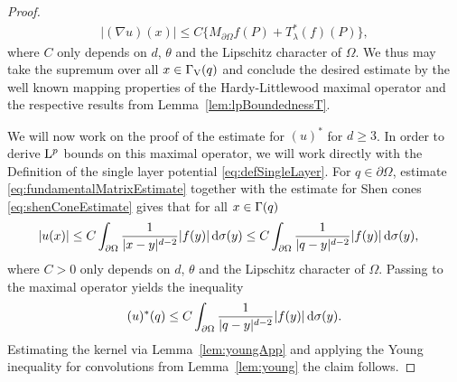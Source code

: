 \begin{proof}
  \begin{align*}
    |(\nabla u)(x)| \leq C \Big\{ M_{\partial\Omega} f(P) + T_\lambda^*(f)(P) \Big\},
  \end{align*}
  where $C$ only depends on $d$, $\theta$ and the Lipschitz character of $\Omega$.
  We thus may take the supremum over all $x \in \Gamma_\mathrm{V}(q)$ and conclude the desired estimate by the well known mapping properties of the Hardy-Littlewood maximal operator and the respective results from Lemma~\ref{lem:lpBoundednessT}.

  We will now work on the proof of the estimate for $(u)^*$ for $d \geq 3$.
  In order to derive $\mathrm{L}^p$ bounds on this maximal operator, we will work directly with the Definition of the single layer potential \eqref{eq:defSingleLayer}.
  For $q \in \partial\Omega$, estimate \eqref{eq:fundamentalMatrixEstimate} together with the estimate for Shen cones \eqref{eq:shenConeEstimate} gives that for all $x \in \Gamma(q)$
  \begin{align*}
    |u(x)| 
    &\leq  C \int_{\partial\Omega} \frac{1}{|x - y|^{d - 2}} |f(y)| \, {\operatorname{d}\!{\sigma}}(y) 
    \leq  C \int_{\partial\Omega} \frac{1}{|q - y|^{d - 2}} |f(y)| \, {\operatorname{d}\!{\sigma}}(y),
  \end{align*}
  where $C > 0$ only depends on $d$, $\theta$ and the Lipschitz character of $\Omega$.
  Passing to the maximal operator yields the inequality
  \begin{align*}
    (u)^*(q) \leq  C \int_{\partial\Omega} \frac{1}{|q - y|^{d - 2}} |f(y)| \, {\operatorname{d}\!{\sigma}}(y).
  \end{align*}
  Estimating the kernel via Lemma~\ref{lem:youngApp} and applying the Young inequality for convolutions from Lemma~\ref{lem:young} the claim follows.
\end{proof}

